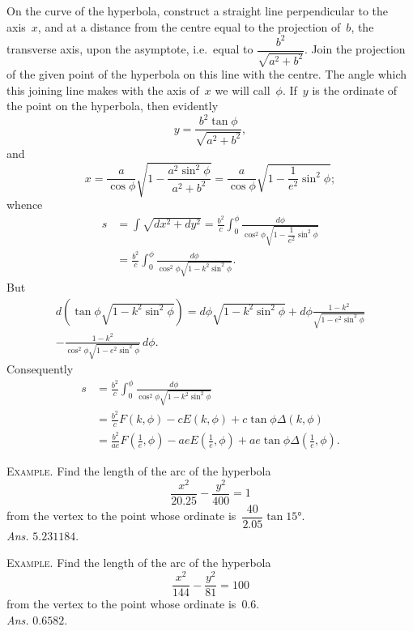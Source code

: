 \documentclass[12pt,leqno]{book}[2005/09/16]
\newcommand{\Example}[1]{\textsc{Example#1}\quad}
\newcommand{\DPtypo}[2]{#2}
\begin{document}
On the curve of the hyperbola, construct a straight line
perpendicular to the axis~$x$, and at a distance from the centre
equal to the projection of~$b$, the transverse axis, upon the
asymptote, i.e.~equal to $\dfrac{b^{2}}{\sqrt{a^{2} + b^{2}}}$\DPtypo{}{.} Join the projection of the
given point of the hyperbola on this line with the centre. The
angle which this joining line makes with the axis of~$x$ we will
call~$\phi$. If~$y$ is the ordinate of the point on the hyperbola, then
evidently
\[
y = \frac{b^{2} \tan \phi}{\sqrt{a^{2} + b^{2}}},
\]
and
\[
x = \frac{a}{\cos \phi} \sqrt{1 - \frac{a^{2} \sin^{2} \phi}{a^{2} + b^{2}}}
  = \frac{a}{\cos \phi} \sqrt{1 - \frac{1}{e^{2}} \sin^{2} \phi};
\]
whence
\begin{align*}
s &= \int \sqrt{\DPtypo{ax}{dx}^{2} + dy^{2}}
   = \frac{b^{2}}{c} \int_{0}^{\phi} \frac{d \phi}{\cos^{2} \phi \sqrt{1 - \dfrac{1}{e^{2}} \sin^{2} \phi}} \\
  &= \frac{b^{2}}{c} \int_{0}^{\phi} \frac{d \phi}{\cos^{2} \phi \sqrt{1 - k^{2} \sin^{2} \phi}}.
\end{align*}
But
\begin{gather*}
d(\tan \phi \sqrt{1 - k^{2} \sin^{2} \phi})
   = d \phi \sqrt{1 - k^{2} \sin^{2} \phi}
   + d \phi \frac{1 - k^{2}}{\sqrt{1 - e^{2} \sin^{2} \phi}} \\
%
- \frac{1 - k^{2}}{\cos^{2} \phi \sqrt{1 - e^{2} \sin^{2} \phi}}\, d \phi.
\end{gather*}
Consequently
\begin{align*}
s &= \frac{b^{2}}{c} \int_{0}^{\phi} \frac{d \phi}{\cos^{2} \phi \sqrt{1 - k^{2} \sin^{2} \phi}} \\
  &= \frac{b^{2}}{c} F(k, \phi) - cE(k, \phi) + c \tan \phi \Delta (k, \phi) \\
  &= \frac{b^{2}}{ae} F\left(\frac{1}{e}, \phi\right) - aeE\left(\frac{1}{e}, \phi\right) + ae \tan \phi \Delta \left(\frac{1}{e}, \phi\right).
\end{align*}

\Example. Find the length of the arc of the hyperbola
\[ %
\frac{x^{2}}{20.25} - \frac{y^{2}}{400} = 1
\]
from the vertex to the point whose ordinate
is~$\dfrac{40}{2.05} \tan 15°$. \\
\null\hfill\textit{Ans.} $5.231184$.

\Example. Find the length of the arc of the hyperbola
\[
\frac{x^{2}}{144} - \frac{y^{2}}{81} = 100
\]
from the vertex to the point whose ordinate
is~$0.6$. \\
\null\hfill\textit{Ans.} $0.6582$.
\end{document}
